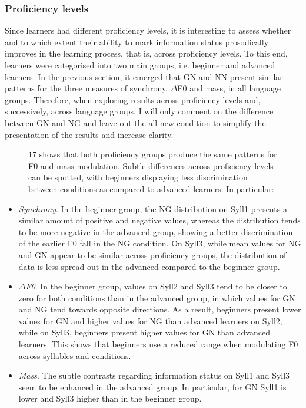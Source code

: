 \subsubsection{Proficiency levels}
\hypertarget{Toc191305909}{}
Since learners had different proficiency levels, it is interesting to assess whether and to which extent their ability to mark information status prosodically improves in the learning process, that is, across proficiency levels. To this end, learners were categorised into two main groups, i.e. beginner and advanced learners. In the previous section, it emerged that GN and NN present similar patterns for the three measures of synchrony, ${\Delta}$F0 and mass, in all language groups. Therefore, when exploring results across proficiency levels and, successively, across language groups, I will only comment on the difference between GN and NG and leave out the all-new condition to simplify the presentation of the results and increase clarity.

\begin{figure}
\caption{17 shows that both proficiency groups produce the same patterns for F0 and mass modulation. Subtle differences across proficiency levels can be spotted, with beginners displaying less discrimination between conditions as compared to advanced learners. In particular:}
\label{fig:key:2}
\end{figure}

\begin{itemize}
\item \textit{Synchrony}. In the beginner group, the NG distribution on Syll1 presents a similar amount of positive and negative values, whereas the distribution tends to be more negative in the advanced group, showing a better discrimination of the earlier F0 fall in the NG condition. On Syll3, while mean values for NG and GN appear to be similar across proficiency groups, the distribution of data is less spread out in the advanced compared to the beginner group.
\item \textit{${\Delta}$F0}. In the beginner group, values on Syll2 and Syll3 tend to be closer to zero for both conditions than in the advanced group, in which values for GN and NG tend towards opposite directions. As a result, beginners present lower values for GN and higher values for NG than advanced learners on Syll2, while on Syll3, beginners present higher values for GN than advanced learners. This shows that beginners use a reduced range when modulating F0 across syllables and conditions.
\item \textit{Mass}. The subtle contrasts regarding information status on Syll1 and Syll3 seem to be enhanced in the advanced group. In particular, for GN Syll1 is lower and Syll3 higher than in the beginner group.
\end{itemize}

